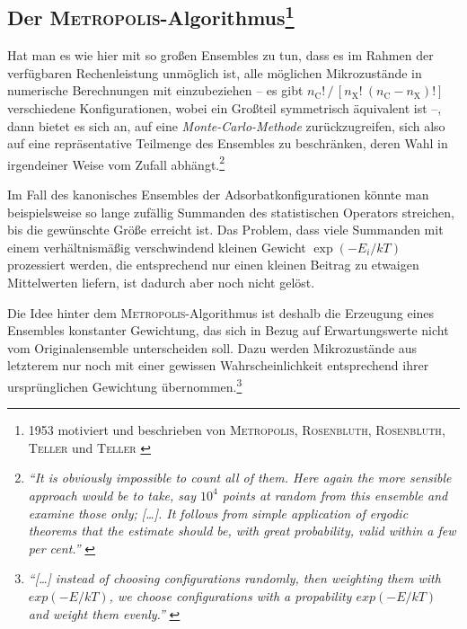 \documentclass[a4paper, 10pt, twoside, openany]{book} %
\newcommand \bracks[1]{\left [ #1 \right ]}
\def \nC {n_\mathrm{C}}
\def \nX {n_\mathrm{X}}
\begin{document}
\subsection[Der \textsc{Metropolis}-Algorithmus]{Der \textsc{Metropolis}-Algorithmus\footnote{1953 motiviert und beschrieben von \textsc{Metropolis}, \textsc{Rosenbluth}, \textsc{Rosenbluth}, \textsc{Teller} und \textsc{Teller} \cite{Metropolis2}}}

Hat man es wie hier mit so großen Ensembles zu tun, dass es im Rahmen der verfügbaren Rechenleistung unmöglich ist, alle möglichen Mikrozustände in numerische Berechnungen mit einzubeziehen -- es gibt $\nC! \, / \, \bracks{\nX! \ (\nC - \nX)!}$ verschiedene Konfigurationen, wobei ein Großteil symmetrisch äquivalent ist --, dann bietet es sich an, auf eine \emph{Monte-Carlo-Methode} zurückzugreifen, sich also auf eine repräsentative Teilmenge des Ensembles zu beschränken, deren Wahl in irgendeiner Weise vom Zufall abhängt.\footnote{\emph{"`It is obviously impossible to count all of them. Here again the more sensible approach would be to take, say $10^4$ points at random from this ensemble and examine those only; \emph{[\dots]}. It follows from simple application of ergodic theorems that the estimate should be, with great probability, valid within a few per cent."'} \cite[S.~336f]{Metropolis1}}

Im Fall des kanonisches Ensembles der Adsorbatkonfigurationen könnte man beispielsweise so lange zufällig Summanden des statistischen Operators streichen, bis die gewünschte Größe erreicht ist. Das Problem, dass viele Summanden mit einem verhältnismäßig verschwindend kleinen Gewicht $\exp(-E_i / k T)$ prozessiert werden, die entsprechend nur einen kleinen Beitrag zu etwaigen Mittelwerten liefern, ist dadurch aber noch nicht gelöst.

Die Idee hinter dem \textsc{Metropolis}-Algorithmus ist deshalb die Erzeugung eines Ensembles konstanter Gewichtung, das sich in Bezug auf Erwartungswerte nicht vom Originalensemble unterscheiden soll. Dazu werden Mikrozustände aus letzterem nur noch mit einer gewissen Wahrscheinlichkeit entsprechend ihrer ursprünglichen Gewichtung übernommen.\footnote{\emph{"`\emph{[\dots]} instead of choosing configurations randomly, then weighting them with $exp(-E / k T)$, we choose configurations with a propability $exp(-E / k T)$ and weight them evenly."'} \cite[S.~1088]{Metropolis2}}
\end{document}
